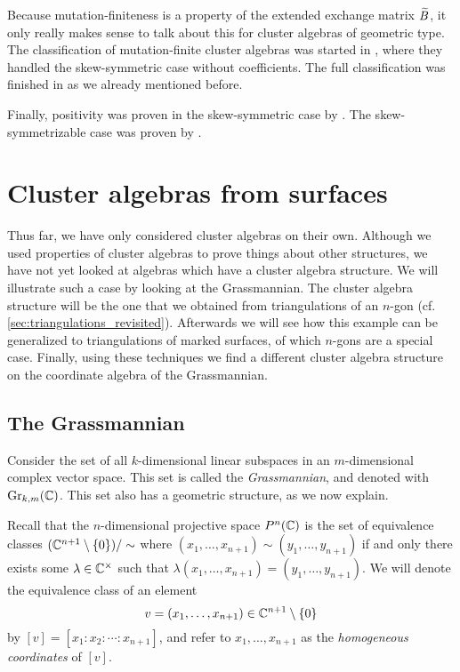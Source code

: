 Because mutation-finiteness is a property of the extended exchange matrix $\widetilde{B}$, it
only really makes sense to talk about this for cluster algebras of geometric type. The
classification of mutation-finite cluster algebras was started in
\cite{FeliksonShapiroTumarkin2012SkewSCA}, where they handled the skew-symmetric case
without coefficients. The full classification was finished in
\cite{FeliksonPavel2023cluster} as we already mentioned before.

Finally, positivity was proven in the skew-symmetric case by
\textcite{LeeSchiffler2015PositivityCA}. The skew-symmetrizable case was proven by
\textcite{GrossHackingKeelKontsevich2018CanonicalBCA}.

\section{Cluster algebras from surfaces}\label{sec:cluster_algebras_surfaces}

Thus far, we have only considered cluster algebras on their own. Although we used
properties of cluster algebras to prove things about other structures, we have not yet
looked at algebras which have a cluster algebra structure. We will illustrate such a
case by looking at the Grassmannian. The cluster algebra structure will be the one that
we obtained from triangulations of an $n$-gon (cf.
\cref{sec:triangulations_revisited}). Afterwards we will see how this example can be
generalized to triangulations of marked surfaces, of which $n$-gons are a special case.
Finally, using these techniques we find a different cluster algebra structure on the
coordinate algebra of the Grassmannian.

\subsection{The Grassmannian}

Consider the set of all $k$-dimensional linear subspaces in an $m$-dimensional complex
vector space. This set is called the \emph{Grassmannian}, and
denoted with $\operatorname{Gr}_{k,m}(\mathbb{C})$. This set also has a
geometric structure, as we now explain.

Recall that the $n$-dimensional projective space $P^n(\mathbb{C})$ is the set of equivalence
classes $(\mathbb{C}^{n+1} \setminus \{0\}) / \sim$ where $ (x_1, \dots, x_{n+1}) \sim (y_1,
	\dots, y_{n+1})$ if and only there exists some $\lambda \in \mathbb{C}^\times$ such that
$\lambda(x_1, \dots, x_{n+1}) = (y_1, \dots, y_{n+1})$. We will denote the equivalence
class of an element
\begin{equation*}
	v = (x_1, \dots, x_{n+1}) \in \mathbb{C}^{n+1} \setminus \{0\}
\end{equation*}
%
by $[v] = [x_1 \colon x_2 \colon \dotsb \colon x_{n+1}]$, and refer to $x_1, \dots,
	x_{n+1}$ as the \emph{homogeneous coordinates} of $[v]$.

